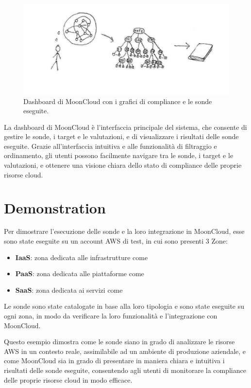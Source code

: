 \begin{center}
\begin{figure}
\centering
\includegraphics[width=\textwidth]{immagini/ideas2text.pdf}
\caption{Dashboard di MoonCloud con i grafici di compliance e le sonde eseguite.}
\label{fig:dashboardmooncloud}
\end{figure}
\end{center}

La dashboard di MoonCloud è l'interfaccia principale del sistema, che consente di gestire le sonde, i target e le valutazioni, e di visualizzare i risultati delle sonde eseguite. Grazie all'interfaccia intuitiva e alle funzionalità di filtraggio e ordinamento, gli utenti possono facilmente navigare tra le sonde, i target e le valutazioni, e ottenere una visione chiara dello stato di compliance delle proprie risorse cloud. 

\section{Demonstration}
\label{sec:demonstration}

Per dimostrare l'esecuzione delle sonde e la loro integrazione in MoonCloud, esse sono state eseguite su un account AWS di test, in cui sono presenti 3 Zone:

\begin{itemize}
    \item \textbf{IaaS}: zona dedicata alle infrastrutture come  
    \item \textbf{PaaS}: zona dedicata alle piattaforme come
    \item \textbf{SaaS}: zona dedicata ai servizi come 
\end{itemize}

Le sonde sono state catalogate in base alla loro tipologia e sono state eseguite su ogni zona, in modo da verificare la loro funzionalità e l'integrazione con MoonCloud.

Questo esempio dimostra come le sonde siano in grado di analizzare le risorse AWS in un contesto reale, assimilabile ad un ambiente di produzione aziendale, e come MoonCloud sia in grado di presentare in maniera chiara e intuitiva i risultati delle sonde eseguite, consentendo agli utenti di monitorare la compliance delle proprie risorse cloud in modo efficace.